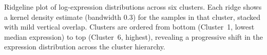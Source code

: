 \caption{Ridgeline plot of log-expression distributions across six clusters. Each ridge shows a kernel density estimate (bandwidth 0.3) for the samples in that cluster, stacked with mild vertical overlap. Clusters are ordered from bottom (Cluster~1, lowest median expression) to top (Cluster~6, highest), revealing a progressive shift in the expression distribution across the cluster hierarchy.}
